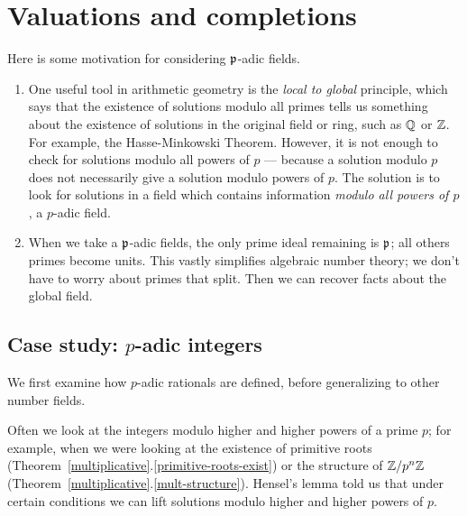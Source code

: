 \chapter{Valuations and completions}
Here is some motivation for considering $\mathfrak{p}$-adic fields.
\begin{enumerate}
\item One useful tool in arithmetic geometry is the {\it local to global} principle, which says that the existence of solutions modulo all primes tells us something about the existence of solutions in the original field or ring, such as $\mathbb{Q}$ or $\mathbb{Z}$. For example, the Hasse-Minkowski Theorem. However, it is not enough to check for solutions modulo all powers of $p$ --- because a solution modulo $p$ does not necessarily give a solution modulo powers of $p$. The solution is to look for solutions in a field which contains information {\it modulo all powers of $p$}, a $p$-adic field.
\item When we take a $\mathfrak{p}$-adic fields, the only prime ideal remaining is $\mathfrak{p}$; all others primes become units. This vastly simplifies algebraic number theory; we don't have to worry about primes that split. Then we can recover facts about the global field.
\end{enumerate}
\section{Case study: $p$-adic integers}
We first examine how $p$-adic rationals are defined, before generalizing to other number fields.

Often we look at the integers modulo higher and higher powers of a prime $p$; for example,  when we were looking at the existence of primitive roots (Theorem~\ref{multiplicative}.\ref{primitive-roots-exist}) or the structure of $\mathbb{Z}/p^n\mathbb{Z}$ (Theorem~\ref{multiplicative}.\ref{mult-structure}). Hensel's lemma told us that under certain conditions we can lift solutions modulo higher and higher powers of $p$.

